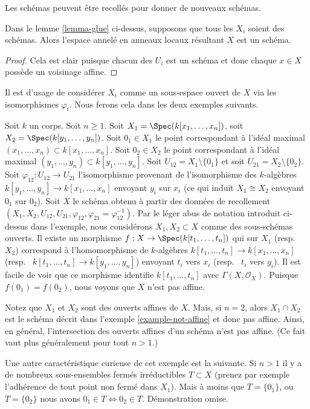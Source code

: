 \begin{lemma}
\label{lemma-glue-schemes}
\begin{slogan}
Les schémas peuvent être recollés pour donner de nouveaux schémas.
\end{slogan}
Dans le lemme \ref{lemma-glue} ci-dessus, supposons que tous les
$X_i$ soient des schémas. Alors l'espace annelé en anneaux locaux
résultant $X$ est un schéma.
\end{lemma}

\begin{proof}
Cela est clair puisque chacun des $U_i$ est un schéma
et donc chaque $x \in X$ possède un voisinage affine.
\end{proof}

\noindent
Il est d'usage de considérer $X_i$ comme un sous-espace ouvert de
$X$ via les isomorphismes $\varphi_i$. Nous ferons cela dans les
deux exemples suivants.

\begin{example}
\label{example-affine-space-zero-doubled}
Soit $k$ un corps. Soit $n \geq 1$.
Soit $X_1 = \Spec(k[x_1, \ldots, x_n])$, soit
$X_2 = \Spec(k[y_1, \ldots, y_n])$. Soit
$0_1 \in X_1$ le point correspondant à l'idéal maximal $(x_1, \ldots,
x_n) \subset k[x_1, \ldots, x_n]$. Soit $0_2 \in
X_2$ le point correspondant à l'idéal maximal $(y_1, \ldots, y_n)
\subset k[y_1, \ldots, y_n]$. Soit $U_{12} = X_1 \setminus
\{0_1\}$ et soit $U_{21} = X_2 \setminus
\{0_2\}$. Soit $\varphi_{12} : U_{12} \to
U_{21}$ l'isomorphisme provenant de l'isomorphisme des
$k$-algèbres $k[y_1, \ldots, y_n] \to k[x_1,
\ldots, x_n]$ envoyant $y_i$ sur $x_i$ (ce qui
induit $X_1 \cong X_2$ envoyant $0_1$ sur $0_2$). Soit $X$ le schéma
obtenu à partir
des données de recollement $(X_1, X_2, U_{12}, U_{21},
\varphi_{12}, \varphi_{21} = \varphi_{12}^{-1})$.
Par le léger abus de notation introduit ci-dessus dans
l'exemple, nous considérons $X_1, X_2 \subset X$ comme
des sous-schémas ouverts. Il existe un
morphisme $f : X \to \Spec(k[t_1, \ldots, t_n])$ qui sur $X_1$
(resp. \ $X_2$) correspond à l'homomorphisme de $k$-algèbres
$k[t_1, \ldots, t_n] \to k[x_1, \ldots, x_n]$ (resp.
\ $k[t_1, \ldots, t_n] \to k[y_1, \ldots, y_n]$) envoyant
$t_i$ vers $x_i$ (resp. \ $t_i$ vers $y_i$). Il
est facile de voir que ce morphisme identifie $k[t_1,
\ldots, t_n]$ avec $\Gamma(X, \mathcal{O}_X)$. Puisque $f(0_1)
= f(0_2)$, nous voyons que $X$ n'est pas affine.

\medskip\noindent
Notez que $X_1$ et $X_2$ sont des ouverts affines de
$X$. Mais, si $n = 2$, alors $X_1 \cap X_2$ est le schéma
décrit dans l'exemple \ref{example-not-affine} et donc pas affine.
Ainsi, en général, l'intersection des ouverts affines d'un schéma
n'est pas affine. (Ce fait vaut plus généralement pour tout $n > 1$.)

\medskip\noindent
Une autre caractéristique curieuse de cet exemple est la suivante.
Si $n > 1$ il y a de nombreux sous-ensembles fermés irréductibles $T \subset
X$ (prenez par exemple l'adhérence de tout point non fermé dans $X_1$).
Mais à moins que $T = \{0_1\}$, ou $T = \{0_2\}$ nous avons
$0_1 \in T \Leftrightarrow 0_2 \in T$. Démonstration omise.
\end{example}

